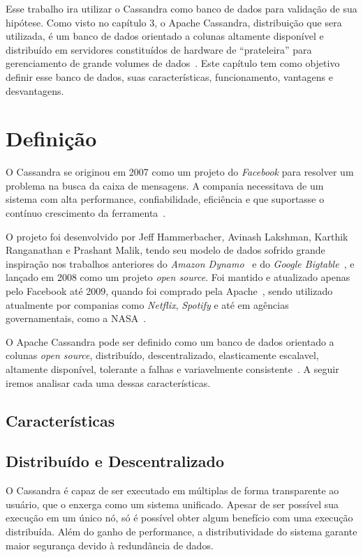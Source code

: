 Esse trabalho ira utilizar o Cassandra como banco de dados para validação de sua hipótese. Como visto no capítulo 3, o Apache Cassandra, distribuição que sera utilizada, é um banco de dados orientado a colunas altamente disponível e distribuído em servidores constituídos de hardware de \enquote{prateleira} para gerenciamento de grande volumes de dados~\cite{lakshmancassandra}. Este capítulo tem como objetivo definir esse banco de dados, suas características, funcionamento, vantagens e desvantagens.

\section{Definição}
O Cassandra se originou em 2007 como um projeto do \emph{Facebook} para resolver um problema na busca da caixa de mensagens. A compania necessitava de um sistema com alta performance, confiabilidade, eficiência e que suportasse o contínuo crescimento da ferramenta~\cite{lakshmancassandra, cassandraguide}. 

O projeto foi desenvolvido por Jeff Hammerbacher, Avinash Lakshman, Karthik Ranganathan e Prashant Malik, tendo seu modelo de dados sofrido grande inspiração nos trabalhos anteriores do \emph{Amazon Dynamo}~\cite{dynamo} e do \emph{Google Bigtable}~\cite{bigtable}, e lançado em 2008 como um projeto \emph{open source}. Foi mantido e atualizado apenas pelo Facebook até 2009, quando foi comprado pela Apache~\cite{cassandraguide}, sendo utilizado atualmente por companias como \emph{Netflix}, \emph{Spotify} e até em agências governamentais, como a NASA~\cite{cassandracompanies}. 

O Apache Cassandra pode ser definido como um banco de dados orientado a colunas \emph{open source}, distribuído, descentralizado, elasticamente escalavel, altamente disponível, tolerante a falhas e variavelmente consistente~\cite{cassandraguide}. A seguir iremos analisar cada uma dessas características.

\subsection{Características}

\subsection*{Distribuído e Descentralizado}
O Cassandra é capaz de ser executado em múltiplas de forma transparente ao usuário, que o enxerga como um sistema unificado. Apesar de ser possível sua execução em um único nó, só é possível obter algum benefício com uma execução distribuída. Além do ganho de performance, a distributividade do sistema garante maior segurança devido à redundância de dados.

